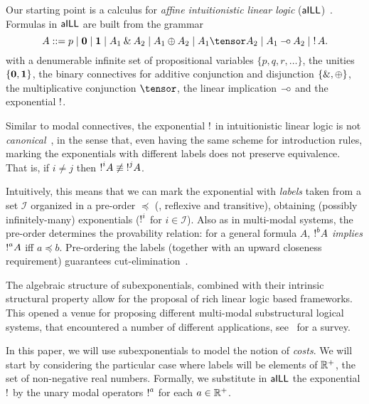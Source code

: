 
Our starting point is a calculus for \emph{affine intuitionistic linear logic} ($\textsf{aILL}$)~\cite{DBLP:journals/tcs/Girard87}. Formulas in $\textsf{aILL}$ are built from the grammar 
\[
 A ::= p \mid \zero \mid \one  
 \mid A_1 \with A_2  \mid A_1 
 \oplus A_2 \mid   A_1 \tensor A_2
  \mid A_1 \lolli A_2\mid \bang A.
\]
with a denumerable infinite set of propositional variables $\{p, q, r, \ldots\}$, the unities $\{{\bf 0},{\bf 1}\}$,  the binary connectives for additive conjunction and disjunction $\{\mathbin{\&},\oplus\}$, the multiplicative conjunction $\tensor$, the  linear implication $\mathbin{-\hspace{-0.70mm}\circ}$ and the exponential $\mathop{!}$.

Similar to modal connectives, the exponential $\mathop{!}$ in intuitionistic linear logic  is not {\em canonical}~\cite{DBLP:conf/kgc/DanosJS93}, in the sense that, even having the same scheme for introduction rules, marking the exponentials with different labels  does not preserve equivalence. That is, if  $i\not= j$ then
$\hbox{$\mathop{!}^{i}$}A\not\equiv\hbox{$\mathop{!}^{j}$}A$.

Intuitively, this means that we can mark the exponential with {\em labels} taken from a set $\mathcal{I}$ organized in a pre-order $\preceq$ (\ie, reflexive and transitive), obtaining (possibly infinitely-many) exponentials ($\hbox{$\mathop{!}^{i}$}$
for $i\in\mathcal{I}$).
Also as in multi-modal systems, the pre-order  determines the provability relation: 
for a general formula $A$, $\hbox{$\mathop{!}^{b}$}A$ {\em implies} $\hbox{$\mathop{!}^{a}$}A$ iff $a \preceq b$.
%
Pre-ordering the labels (together with an upward closeness requirement)
guarantees cut-elimination~\cite{DBLP:journals/jar/NigamM10}. 

The algebraic structure of subexponentials, combined with their intrinsic structural property allow for the proposal of rich linear logic based frameworks. This opened a venue for proposing different multi-modal substructural logical systems, that encountered a number of different applications, see~\cite{DBLP:conf/fscd/PimentelON21} for a survey.

In this paper, we will use subexponentials to model the notion of {\em costs}. We will start by considering the particular case where labels will be elements of $\mathbb{R}^+$, the set of non-negative real numbers. Formally, we substitute in $\textsf{aILL}$
the exponential $\mathop{!}$ by the unary modal operators $\hbox{$\mathop{!}^{a}$}$ 
for each $a\in\mathbb{R}^+$. 


